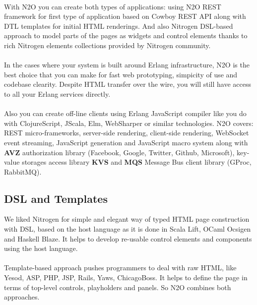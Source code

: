 \paragraph{}
With N2O you can create both types of applications: using N2O REST framework
for first type of application based on Cowboy REST API along with DTL
templates for initial HTML renderings. And also Nitrogen DSL-based approach
to model parts of the pages as widgets and control elements thanks to rich
Nitrogen elements collections provided by Nitrogen community. 

\paragraph{}
In the cases where your system is built around Erlang infrastructure, N2O
is the best choice that you can make for fast web prototyping, simpicity
of use and codebase clearity. Despite HTML transfer over the wire,
you will still have access to all your Erlang services directly.

\paragraph{}
Also you can create off-line clients using Erlang JavaScript compiler
like you do with ClojureScript, JScala, Elm, WebSharper or similar
technologies. N2O covers: REST micro-frameworks, server-side rendering,
client-side rendering, WebSocket event streaming, JavaScript generation
and JavaScript macro system along with {\bf AVZ} authorization
library (Facebook, Google, Twitter, Github, Microsoft), key-value storages
access library {\bf KVS} and {\bf MQS} Message Bus client library (GProc, RabbitMQ).

\subsection*{DSL and Templates}
We liked Nitrogen for simple and elegant way of typed HTML page
construction with DSL, based on the host language as it is done in Scala Lift,
OCaml Ocsigen and Haskell Blaze. It helps to develop re-usable control
elements and components using the host language.

\paragraph{}
Template-based approach pushes programmers to deal with raw HTML,
like Yesod, ASP, PHP, JSP, Rails, Yaws, ChicagoBoss. It helps to
define the page in terms of top-level controls, playholders
and panels. So N2O combines both approaches.


